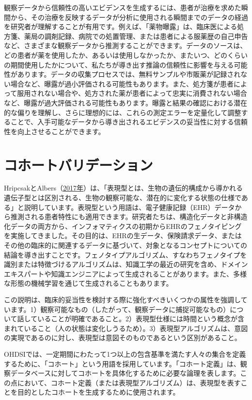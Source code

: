 \documentclass[
  11pt]{book}
\theoremstyle{definition}
\theoremstyle{definition}
\theoremstyle{definition}
\theoremstyle{definition}
\theoremstyle{remark}
\begin{document}
観察データから信頼性の高いエビデンスを生成するには、患者が治療を求めた瞬間から、その治療を反映するデータが分析に使用される瞬間までのデータの経過を研究者が理解することが有用です。例えば、「薬物曝露」は、臨床医による処方箋、薬局の調剤記録、病院での処置管理、または患者による服薬歴の自己申告など、さまざまな観察データから推測することができます。データのソースは、どの患者が薬を使用したか、あるいは使用しなかったか、またいつ、どのくらいの期間使用したかについて、私たちが導き出す推論の信頼性に影響を与える可能性があります。データの収集プロセスでは、無料サンプルや市販薬が記録されない場合など、曝露が過小評価される可能性もあります。また、処方箋が患者によって服用されない場合や、処方された薬が患者によって忠実に消費されない場合など、曝露が過大評価される可能性もあります。曝露と結果の確認における潜在的な偏りを理解し、さらに理想的には、これらの測定エラーを定量化して調整することで、入手可能なデータから導き出されるエビデンスの妥当性に対する信頼性を向上させることができます。

\section{コホートバリデーション}\label{CohortValidation}

HripcsakとAlbers（\href{https://ohdsi.github.io/TheBookOfOhdsi/ClinicalValidity.html\#ref-hripcsak_2017}{2017年}）は、「表現型とは、生物の遺伝的構成から導かれる遺伝子型とは区別される、生物の観察可能な、潜在的に変化する状態の仕様である」と説明しています。表現型という用語は、電子健康記録（EHR）データから推測される患者特性にも適用できます。研究者たちは、構造化データと非構造化データの両方から、インフォマティクスの初期からEHRのフェノタイピングを実施してきました。その目的は、EHRの生データ、保険請求データ、またはその他の臨床的に関連するデータに基づいて、対象となるコンセプトについての結論を導き出すことです。フェノタイプアルゴリズム、すなわちフェノタイプを識別または特徴づけるアルゴリズムは、知識工学の最近の研究を含め、ドメインエキスパートや知識エンジニアによって生成されることがあります。また、多様な形態の機械学習を通じて生成されることもあります。

この説明は、臨床的妥当性を検討する際に強化すべきいくつかの属性を強調しています。1）観察可能なもの（したがって、観察データに捕捉可能なもの）について話していることが明確であること。2）表現型仕様には時間という概念が含まれていること（人の状態は変化しうるため）。3）表現型アルゴリズムは、意図の実現であるのに対し、表現型は意図そのものであるという区別があること。

OHDSIでは、一定期間にわたって1つ以上の包含基準を満たす人々の集合を定義するために、「コホート」という用語を採用しています。「コホート定義」は、観察データベースに対してコホートを具体化するために必要な論理を表します。この点において、コホート定義（または表現型アルゴリズム）は、表現型を表すことを目的としたコホートを生成するために使用されます。
\end{document}
